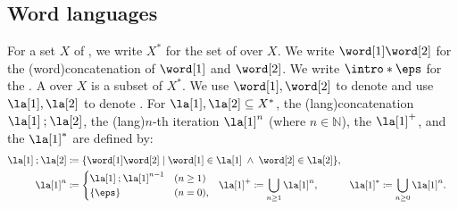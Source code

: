 \documentclass[10pt,a4paper]{article}
\theoremstyle{definition}
\theoremstyle{remark}
\DeclarePairedDelimiter\set{\{}{\}}
\newcommand{\defeq}{\coloneq}
\newcommand{\nat}{\mathbb{N}}
\newcommand{\compo}{\mathbin{;}}
\begin{document}
\subsection{Word languages}
%
\AP
For a set $X$ of \intro*{}, we write $X^{*}$ for the set of \intro*{} over $X$.
\AP
We write $\word[1] \word[2]$ for the \intro*\kl(word){concatenation} of  $\word[1]$ and $\word[2]$.
\AP
We write $\intro*\eps$ for the \intro*{}.
\AP
A \intro*{} over $X$ is a subset of $X^{*}$.
\AP
We use $\word[1], \word[2]$ to denote  and use $\la[1], \la[2]$ to denote .
\AP
For  $\la[1], \la[2] \subseteq X^{*}$, the \intro*\kl(lang){concatenation} $\la[1] \compo \la[2]$,
the \intro*\kl(lang){$n$-th iteration} $\la[1]^n$ (where $n \in \nat$),
the \intro*{} $\la[1]^{+}$, and
the \intro*{} $\la[1]^{*}$ are defined by:
\begin{align*}
    \la[1] \compo \la[2] & \defeq \set{\word[1] \word[2] \mid \word[1] \in \la[1] \;\land\; \word[2] \in \la[2]},\hspace{-.1em}                    \span\span    \\
    \la[1]^{n} & \defeq \begin{cases}
        \la[1] \compo \la[1]^{n-1} & (n \ge 1)\\
        \set{\eps} & (n = 0),
    \end{cases}\hspace{-.1em} & 
    \la[1]^{+}  & \defeq \bigcup_{n \ge 1} \la[1]^{n},\hspace{-.1em}&
    \la[1]^{*}  & \defeq \bigcup_{n \ge 0} \la[1]^{n}.
\end{align*}
\end{document}
